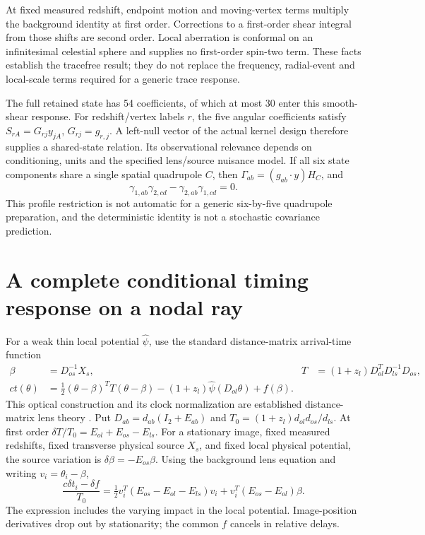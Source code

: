 At fixed measured redshift, endpoint motion and moving-vertex terms
multiply the background identity at first order.  Corrections to a
first-order shear integral from those shifts are second order.  Local
aberration is conformal on an infinitesimal celestial sphere and supplies
no first-order spin-two term.  These facts establish the tracefree result;
they do not replace the frequency, radial-event and local-scale terms
required for a generic trace response.

The full retained state has 54 coefficients, of which at most 30 enter
this smooth-shear response.  For redshift/vertex labels $r$,
the five angular coefficients satisfy $S_{rA}=G_{rj}y_{jA}$,
$G_{rj}=g_{r,j}$.  A left-null vector of the actual kernel design
therefore supplies a shared-state relation.  Its observational relevance
depends on conditioning, units and the specified lens/source nuisance model.
If all six state components share a single spatial quadrupole $C$,
then $\Gamma_{ab}=(g_{ab}\cdot y)H_C$, and
\begin{equation}
 \gamma_{1,ab}\gamma_{2,cd}-\gamma_{2,ab}\gamma_{1,cd}=0.
 \label{eq:common-profile-alignment}
\end{equation}
This profile restriction is not automatic for a generic six-by-five
quadrupole preparation, and the deterministic identity is not a
stochastic covariance prediction.

\section{A complete conditional timing response on a nodal ray}
\label{sec:nodal-timing}

For a weak thin local potential $\widehat\psi$, use the standard
distance-matrix arrival-time function
\begin{align}
 \beta&=D_{os}^{-1}X_s,
 &T&=(1+z_l)D_{ol}^TD_{ls}^{-1}D_{os},\nonumber\\
 ct(\theta)&=\tfrac12(\theta-\beta)^TT(\theta-\beta)
 -(1+z_l)\widehat\psi(D_{ol}\theta)+f(\beta).
 \label{eq:matrix-fermat}
\end{align}
This optical construction and its clock normalization are established
distance-matrix lens theory \cite{Fleury2021,Schneider2019}.
Put $D_{ab}=d_{ab}(I_2+E_{ab})$ and
$T_0=(1+z_l)d_{ol}d_{os}/d_{ls}$.
At first order $\delta T/T_0=E_{ol}+E_{os}-E_{ls}$.
For a stationary image, fixed measured redshifts, fixed transverse
physical source $X_s$, and fixed local physical potential, the source
variation is $\delta\beta=-E_{os}\beta$.
Using the background lens equation and writing $v_i=\theta_i-\beta$,
\begin{equation}
 \frac{c\delta t_i-\delta f}{T_0}
 =\tfrac12v_i^T(E_{os}-E_{ol}-E_{ls})v_i
 +v_i^T(E_{os}-E_{ol})\beta.
 \label{eq:stationary-delay-response}
\end{equation}
The expression includes the varying impact in the local potential.
Image-position derivatives drop out by stationarity; the common $f$
cancels in relative delays.

